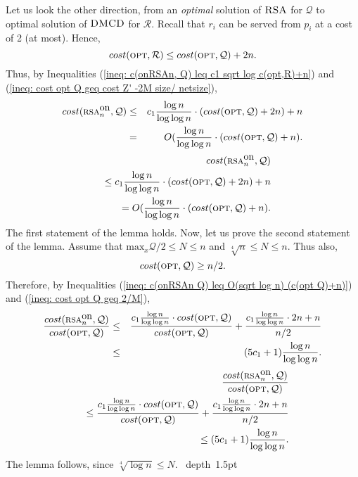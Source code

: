 \documentclass[11pt]{article}
\def\blackslug{\hbox{\hskip 1pt \vrule width 4pt height 8pt
    depth 1.5pt \hskip 1pt}}
\def\QED{\quad\blackslug\lower 8.5pt\null\par}
\newcommand{\DMCD}{\mbox{\sc DMCD}}
\newcommand{\RSA}{\mbox{\sc RSA}}
\newcommand{\cost}[0]{cost}
\newcommand{\calR}{\mathcal{R}}
\newcommand{\calQ}{\mathcal{Q}}
\newcommand{\opt}{\mbox{\textsc{opt}}}
\newcommand{\onRSAn}{\mbox{\sc rsa}^{\mbox{\upshape on}}_{\nn}}
\newcommand{\xmaxQ}[0]{\mbox{max}_x\calQ}
\newcommand{\NN}{N}
\newcommand{\nn}{n}
\newcommand{\loglogratio}[1]{\frac{\log #1}{\log\log #1}}
\begin{document}
{Let us look the other direction, from an {\em optimal} solution of $\RSA$ for $\calQ$ to optimal solution of $\DMCD$ for $\calR$.
Recall that $r_i$ can be served from $p_i$ at a cost of 2 (at most).
Hence,
\begin{equation}
\cost(\opt,\calR) \leq \cost(\opt,\calQ)+2\nn.
\label{ineq: cost opt Q geq cost Z' -2M size/ netsize}
\end{equation}
Thus, by Inequalities (\ref{ineq: c(onRSAn, Q) leq c1 sqrt log c(opt,R)+n}) and (\ref{ineq: cost opt Q geq cost Z' -2M size/ netsize}),
\commsingle
\begin{eqnarray}
\label{ineq: c(onRSAn Q) leq O(sqrt log n) (c(opt Q)+n)}
\cost(\onRSAn,\calQ)&\leq&
c_1\loglogratio{n}\cdot(\cost(\opt,\calQ)+2\nn)+\nn\\
&=&O(\loglogratio{n}\cdot(\cost(\opt,\calQ)+\nn).\nonumber
\end{eqnarray}
\commsingleend
\commdouble
\begin{eqnarray}
\label{ineq: c(onRSAn Q) leq O(sqrt log n) (c(opt Q)+n)}
&&\cost(\onRSAn,\calQ)\\
&&\leq c_1\loglogratio{n}\cdot(\cost(\opt,\calQ)+2\nn)+\nn\nonumber\\
&&=O(\loglogratio{n}\cdot(\cost(\opt,\calQ)+\nn).\nonumber
\end{eqnarray}
\commdoubleend
The first statement of the lemma holds.
Now, let us prove the second statement of the lemma.
Assume that $\xmaxQ/2\leq\NN\leq\nn$ and $\sqrt[4]{\nn}\leq\NN\leq \nn$.
Thus also,
\begin{equation}
\cost(\opt,\calQ) \geq \nn/2.
\label{ineq: cost opt Q geq 2/M}
\end{equation}
Therefore, by Inequalities (\ref{ineq: c(onRSAn Q) leq O(sqrt log n) (c(opt Q)+n)}) and (\ref{ineq: cost opt Q geq 2/M}),
\commsingle
\begin{eqnarray*}
\frac{\cost(\onRSAn,\calQ)}{\cost(\opt,\calQ)}
&\leq&
\frac{c_1\loglogratio{n}\cdot\cost(\opt,\calQ)}
{\cost(\opt,\calQ)}+
\frac{c_1\loglogratio{n}\cdot2\nn+\nn}
{\nn/2}
\\
&\leq& (5c_1+1)\loglogratio{n}
.
\end{eqnarray*}
\commsingleend
\commdouble
\begin{eqnarray*}
&&\frac{\cost(\onRSAn,\calQ)}{\cost(\opt,\calQ)}\\
&&\leq
\frac{c_1\loglogratio{n}\cdot\cost(\opt,\calQ)}
{\cost(\opt,\calQ)}+
\frac{c_1\loglogratio{n}\cdot2\nn+\nn}
{\nn/2}
\\
&&\leq (5c_1+1)\loglogratio{n}.
\end{eqnarray*}
\commdoubleend
The lemma follows, since $\sqrt[4]{\log \nn}\leq \NN$.
\QED
}\ProofLEMMAonRSAnLOGcomp
\end{document}
